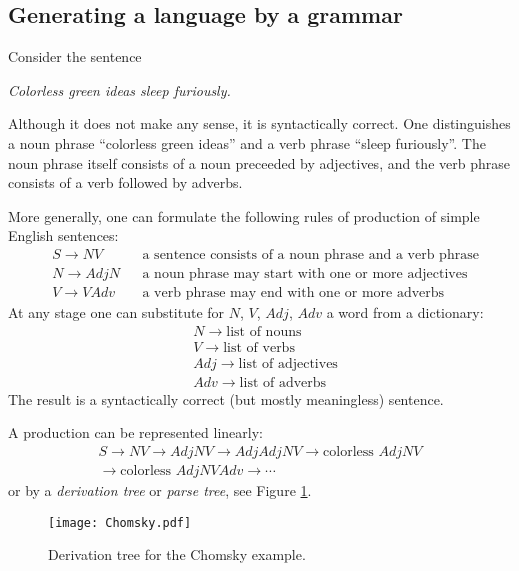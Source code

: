 \begin{page}
\setcounter{section}{5}
\setcounter{subsection}{1}
\setcounter{dfn}{0}
\label{portion:1073}

\subsection{Generating a language by a grammar}
\label{sec:LangGram}
Consider the sentence
\begin{center}
\emph{Colorless green ideas sleep furiously.}
\end{center}
Although it does not make any sense, it is syntactically correct.
One distinguishes a noun phrase ``colorless green ideas'' and a verb phrase ``sleep furiously''.
The noun phrase itself consists of a noun preceeded by adjectives, and the verb phrase consists of a verb followed by adverbs.

More generally, one can formulate the following rules of production of simple English sentences:
\begin{align*}
&S \to NV &&\text{a sentence consists of a noun phrase and a verb phrase}\\
&N \to AdjN &&\text{a noun phrase may start with one or more adjectives}\\
&V \to VAdv &&\text{a verb phrase may end with one or more adverbs}
\end{align*}
At any stage one can substitute for $N$, $V$, $Adj$, $Adv$ a word from a dictionary:
\begin{align*}
&N \to \text{list of nouns}\\
&V \to \text{list of verbs}\\
&Adj \to \text{list of adjectives}\\
&Adv \to \text{list of adverbs}
\end{align*}
The result is a syntactically correct (but mostly meaningless) sentence.

A production can be represented linearly:
\begin{multline*}
S \to NV \to AdjNV \to AdjAdjNV \to \text{colorless }AdjNV\\
\to \text{colorless }AdjNVAdv \to \cdots 
\end{multline*}
or by a \emph{derivation tree} or \emph{parse tree}, see Figure \ref{fig:Chomsky}.

\begin{figure}[ht]
\begin{center}
\texttt{[image: Chomsky.pdf]}
\end{center}
\caption{Derivation tree for the Chomsky example.}
\label{fig:Chomsky}
\end{figure}


\end{page}
